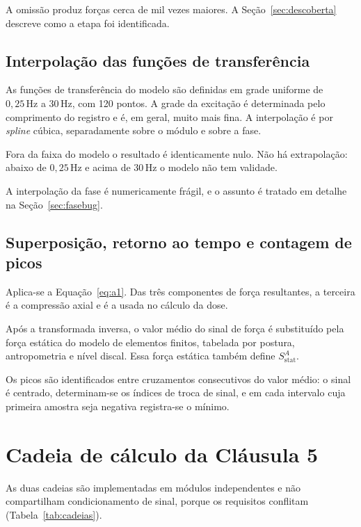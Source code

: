 \documentclass[11pt,a4paper]{article}
\newcommand{\unit}[2]{\ensuremath{#1\,\mathrm{#2}}}
\begin{document}
A omissão produz forças cerca de mil vezes maiores. A
Seção~\ref{sec:descoberta} descreve como a etapa foi identificada.

\subsection{Interpolação das funções de transferência}
\label{sec:fase}

As funções de transferência do modelo são definidas em grade uniforme de
\unit{0{,}25}{Hz} a \unit{30}{Hz}, com 120 pontos. A grade da excitação é
determinada pelo comprimento do registro e é, em geral, muito mais fina. A
interpolação é por \emph{spline} cúbica, separadamente sobre o módulo e sobre a
fase.

Fora da faixa do modelo o resultado é identicamente nulo. Não há extrapolação:
abaixo de \unit{0{,}25}{Hz} e acima de \unit{30}{Hz} o modelo não tem validade.

A interpolação da fase é numericamente frágil, e o assunto é tratado em detalhe
na Seção~\ref{sec:fasebug}.

\subsection{Superposição, retorno ao tempo e contagem de picos}

Aplica-se a Equação~\eqref{eq:a1}. Das três componentes de força resultantes, a
terceira é a compressão axial e é a usada no cálculo da dose.

Após a transformada inversa, o valor médio do sinal de força é substituído pela
força estática do modelo de elementos finitos, tabelada por postura,
antropometria e nível discal. Essa força estática também define
$S^{A}_{\mathrm{stat}}$.

Os picos são identificados entre cruzamentos consecutivos do valor médio: o
sinal é centrado, determinam-se os índices de troca de sinal, e em cada
intervalo cuja primeira amostra seja negativa registra-se o mínimo.

\section{Cadeia de cálculo da Cláusula 5}
\label{sec:cadeiaC5}

As duas cadeias são implementadas em módulos independentes e não compartilham
condicionamento de sinal, porque os requisitos conflitam
(Tabela~\ref{tab:cadeias}).
\end{document}

